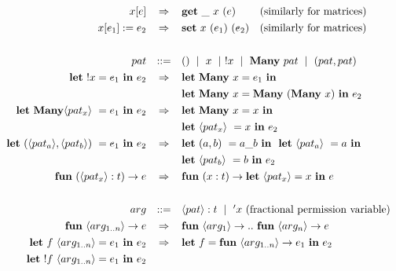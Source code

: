 \begin{figure}
\begin{center}
\[\def\arraystretch{1.3}
    \begin{array}{rcl}
    x[e] &
    \Rightarrow &
    \mathbf{get}\ \_\ x\ (e) \;\qquad \textrm{(similarly for matrices)}
\\
    x[e_1] := e_2 &
    \Rightarrow &
    \mathbf{set}\ x\ (e_1)\ (e_2) \quad \textrm{(similarly for matrices)}
\\
\\
    pat & ::= & ()\ \mid\ x\ \mid\ !x\ \mid\ \mathbf{Many\ } pat\ \mid\ (pat, pat)
\\
    \mathbf{let}\ !x = e_1\ \mathbf{in}\ e_2 &
    \Rightarrow &
    \specialcell[t]{l}{\mathbf{let\ Many}\ x = e_1\ \mathbf{in\ } \\
    \mathbf{let\ Many}\ x = \mathbf{Many}\ (\mathbf{Many}\ x)\ \mathbf{in}\ e_2}
\\
    \mathbf{let\ Many} \langle pat_x \rangle\ = e_1\ \mathbf{in}\ e_2 &
    \Rightarrow &
    \specialcell[t]{l}{%
        \mathbf{let\ Many}\ x = x\ \mathbf{in\ } \\
        \mathbf{let\ } \langle pat_x \rangle\ = x\ \mathbf{in\ } e_2}
\\
    \mathbf{let}\ (\langle pat_a \rangle, \langle pat_b \rangle)\  = e_1\ \mathbf{in}\ e_2 &
    \Rightarrow &
    \specialcell[t]{l}{%
        \mathbf{let\ } (a,b)\ = a\_b\ \mathbf{in\ }
        \ \mathbf{let\ } \langle pat_a \rangle\ = a\ \mathbf{in\ } \\
        \mathbf{let\ } \langle pat_b \rangle\ = b\ \mathbf{in\ } e_2}
\\
    \mathbf{fun}\ (\langle pat_x \rangle : t) \rightarrow e &
    \Rightarrow &
    \mathbf{fun}\ (x : t) \rightarrow \mathbf{let\ } \langle pat_x \rangle = x\ \mathbf{in\ } e
\\
\\
    arg & ::= & \langle pat \rangle : t\ \mid\ {'x} \textrm{ (fractional permission variable)}
\\
    \mathbf{fun}\ \langle arg_{1 .. n} \rangle \rightarrow e &
    \Rightarrow &
    \mathbf{fun}\ \langle arg_1 \rangle \rightarrow ..
    \ \mathbf{fun}\ \langle arg_n \rangle \rightarrow e
\\
    \mathbf{let}\ f\ {\langle arg_{1 .. n} \rangle} = e_1\ \mathbf{in}\ e_2 &
    \Rightarrow &
    \mathbf{let}\ f = \mathbf{fun}\ {\langle arg_{1 .. n} \rangle} \rightarrow e_1\
    \mathbf{in}\ e_2
\\
    \mathbf{let}\ !f\ {\langle arg_{1 .. n} \rangle} = e_1\ \mathbf{in}\ e_2 &

\end{array}\]
\end{center}
\end{figure}
